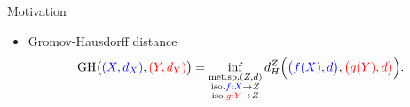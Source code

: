 \documentclass{beamer}
\newcommand{\gh}{\text{GH}}
\begin{document}
\begin{frame}{Motivation}
\begin{minipage}[t]{0.6\linewidth}
\begin{itemize}
      \vspace{-0.4cm}
      \item Gromov-Hausdorff distance \parencite{Gromov81,Gromov99}
      \vspace{-0.3cm}
      \begin{align*}
        \gh \big( {\color{blue}{(X, d_X)}}, {\color{red}{(Y, d_Y)}} \big) =
        \inf_{\substack{\text{met.sp.}(Z, d) \\
        \text{iso.} {\color{blue}{f: X}} \to Z \\
        \text{iso.} {\color{red}{g: Y}} \to Z}}
        d_{H}^{Z} \Big( {\color{blue}{\big(f(X), d \big)}}, {\color{red}{\big(g(Y), d \big)}} \Big).
       \end{align*}
    \end{itemize}
    \end{minipage}%

    \hfill%
    \hspace{-6cm}
    \begin{minipage}[t]{0.5\linewidth}
    \end{minipage}
\vspace{1cm}

\end{frame}

\end{document}
